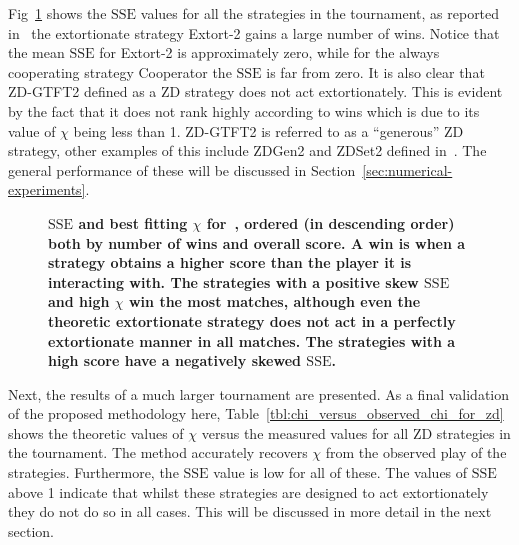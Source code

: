 \documentclass[10pt,letterpaper]{article}
\newcommand{\SSe}{\text{SSE}}
\begin{document}
Fig~\ref{fig:sserror_in_stewart_plotkin} shows the
\(\SSe\) values for all the strategies in the tournament, as
reported in~\cite{Stewart2012} the extortionate strategy Extort-2 gains a large number of
wins. Notice that the mean \(\SSe\) for Extort-2 is approximately zero, while for
the always cooperating strategy Cooperator the \(\SSe\) is far from zero. It is
also clear that ZD-GTFT2 defined as a ZD strategy does not act
extortionately. This is evident by the fact that it does not rank highly according
to wins which is due to its value of \(\chi\) being less than 1.
ZD-GTFT2 is referred to as a ``generous'' ZD strategy, other examples of this
include ZDGen2 and ZDSet2 defined in~\cite{sep-prisoner-dilemma}. The
general performance of these will be discussed in
Section~\ref{sec:numerical-experiments}.

\begin{figure}[!htbp]
    \centering
    \caption{{\bf\(\SSe\) and best fitting \(\chi\) for~\cite{Stewart2012},
        ordered (in descending order) both by number of wins and overall score.
        A win is when a strategy obtains a higher score than the player it is
        interacting with.
        The strategies with a positive skew
        \(\SSe\) and high \(\chi\) win the most matches, although even the
        theoretic
        extortionate strategy does not act in a perfectly extortionate manner in
        all matches. The strategies with a high score have a negatively skewed
        \(\SSe\).
        }}
    \label{fig:sserror_in_stewart_plotkin}
\end{figure}

Next, the results of a much larger tournament are presented.
As a final validation of the proposed methodology here,
Table~\ref{tbl:chi_versus_observed_chi_for_zd} shows the theoretic values of
\(\chi\) versus the measured values for all ZD strategies in the tournament.
The method accurately recovers \(\chi\) from the observed play of
the strategies. Furthermore, the \(\SSe\) value is low for all of these. The
values of \(\SSe\) above 1 indicate that whilst these strategies are designed to
act extortionately they do not do so in all cases. This will be discussed in
more detail in the next section.
\end{document}

